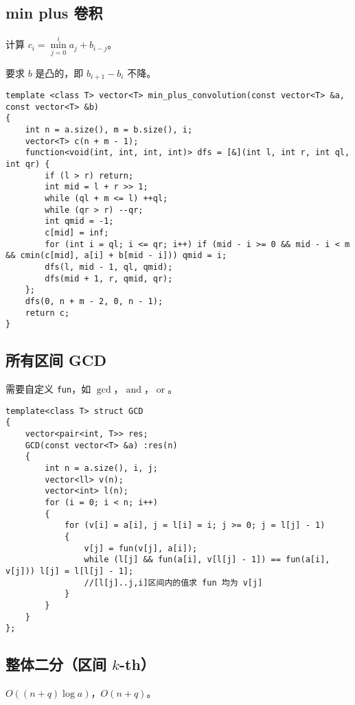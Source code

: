 \documentclass[12pt]{ctexart}
\begin{document}
\subsection{min plus 卷积}

计算 $c_i=\min\limits_{j=0}^i a_j+b_{i-j}$。

要求 $b$ 是凸的，即 $b_{i+1}-b_i$ 不降。

\begin{lstlisting}
template <class T> vector<T> min_plus_convolution(const vector<T> &a, const vector<T> &b)
{
	int n = a.size(), m = b.size(), i;
	vector<T> c(n + m - 1);
	function<void(int, int, int, int)> dfs = [&](int l, int r, int ql, int qr) {
		if (l > r) return;
		int mid = l + r >> 1;
		while (ql + m <= l) ++ql;
		while (qr > r) --qr;
		int qmid = -1;
		c[mid] = inf;
		for (int i = ql; i <= qr; i++) if (mid - i >= 0 && mid - i < m && cmin(c[mid], a[i] + b[mid - i])) qmid = i;
		dfs(l, mid - 1, ql, qmid);
		dfs(mid + 1, r, qmid, qr);
	};
	dfs(0, n + m - 2, 0, n - 1);
	return c;
}

\end{lstlisting}

\subsection{所有区间 GCD}

需要自定义 \verb|fun|，如 $\gcd$，$\operatorname{and}$，$\operatorname{or}$。

\begin{lstlisting}
template<class T> struct GCD
{
	vector<pair<int, T>> res;
	GCD(const vector<T> &a) :res(n)
	{
		int n = a.size(), i, j;
		vector<ll> v(n);
		vector<int> l(n);
		for (i = 0; i < n; i++)
		{
			for (v[i] = a[i], j = l[i] = i; j >= 0; j = l[j] - 1)
			{
				v[j] = fun(v[j], a[i]);
				while (l[j] && fun(a[i], v[l[j] - 1]) == fun(a[i], v[j])) l[j] = l[l[j] - 1];
				//[l[j]..j,i]区间内的值求 fun 均为 v[j]
			}
		}
	}
};
\end{lstlisting}
\subsection{整体二分（区间 $k$-th）}

$O((n+q)\log a)$，$O(n+q)$。
\end{document}
